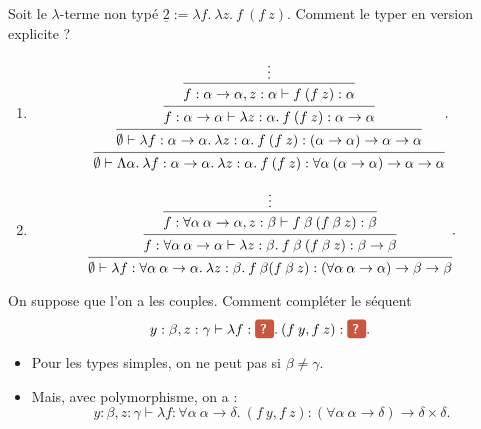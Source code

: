 \documentclass[./main]{subfiles}
\begin{document}
  \begin{exm}
    Soit le $\lambda$-terme non typé $\underline{2} := \lambda f. \: \lambda z.\: f \: (f \: z)$.
    Comment le typer en version explicite ?

    \begin{enumerate}
      \item \[
          \begin{prooftree}
            \hypo{\vdots}
            \infer 1{f : \alpha \to \alpha, z : \alpha \vdash f \: (f \: z) : \alpha}
            \infer 1{f : \alpha \to \alpha \vdash \lambda z : \alpha.\: f \: (f \: z) : \alpha \to \alpha}
            \infer 1{\emptyset \vdash \lambda f : \alpha \to \alpha. \: \lambda z : \alpha.\: f \: (f \: z) : (\alpha \to \alpha) \to \alpha \to \alpha}
            \infer 1{\emptyset \vdash \Lambda \alpha.\: \lambda f : \alpha \to \alpha. \: \lambda z : \alpha.\: f \: (f \: z) : \forall \alpha \: (\alpha \to \alpha) \to \alpha \to \alpha}
          \end{prooftree}
      .\] 
      \item \[
          \begin{prooftree}
            \hypo{\vdots}
            \infer 1{f : \forall  \alpha \: \alpha \to \alpha, z : \beta \vdash f \: \beta \: (f \: \beta\: z) : \beta}
            \infer 1{f : \forall  \alpha \: \alpha \to \alpha \vdash \lambda z : \beta.\: f \: \beta \: (f \: \beta\: z) : \beta \to \beta}
            \infer 1{\emptyset \vdash \lambda f : \forall \alpha \: \alpha \to \alpha. \: \lambda z : \beta. \: f \: \beta (f\: \beta \: z) : (\forall \alpha \: \alpha \to \alpha) \to \beta \to \beta}
          \end{prooftree}
      .\]
    \end{enumerate}
  \end{exm}

  \begin{exm}
    On suppose que l'on a les couples.
    Comment compléter le séquent \[
    y : \beta, z : \gamma \vdash \lambda f : \redQuestionBox. \: (f \: y, f \: z) : \redQuestionBox
    .\]
    \begin{itemize}
      \item Pour les types simples, on ne peut pas si $\beta \neq \gamma$.
      \item Mais, avec polymorphisme, on a : \[
        y : \beta, z : \gamma \vdash \lambda f : \forall  \alpha \: \alpha \to \delta. \: (f \: y, f \: z) : (\forall  \alpha \: \alpha \to \delta) \to \delta \times \delta
      .\]
    \end{itemize}
  \end{exm}
\end{document}
